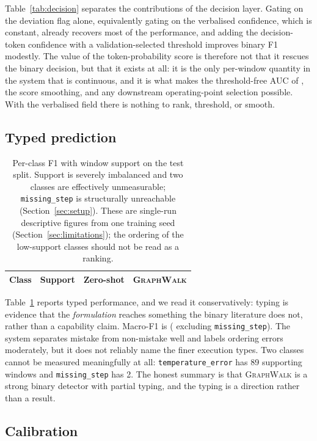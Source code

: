\documentclass[10pt,twocolumn]{article}
\newcommand{\ourmodel}{\textsc{GraphWalk}}
\begin{document}
Table~\ref{tab:decision} separates the contributions of the decision layer.
Gating on the deviation flag alone, equivalently gating on the verbalised
confidence, which is constant, already recovers most of the performance, and
adding the decision-token confidence with a validation-selected threshold
improves binary F1 modestly. The value of the token-probability score is
therefore not that it rescues the binary decision, but that it exists at all: it
is the only per-window quantity in the system that is continuous, and it is what
makes the threshold-free AUC of \resAUC{}, the score smoothing, and any
downstream operating-point selection possible. With the verbalised field there is
nothing to rank, threshold, or smooth.

\subsection{Typed prediction}

\begin{table}[t]
\centering\small
\begin{tabular}{lrcc}
\toprule
Class & Support & Zero-shot & \ourmodel{}\\
\midrule

\end{tabular}
\caption{Per-class F1 with window support on the test split. Support is severely
imbalanced and two classes are effectively unmeasurable;
\texttt{missing\_step} is structurally unreachable (Section~\ref{sec:setup}).
These are single-run descriptive figures from one training seed
(Section~\ref{sec:limitations}); the ordering of the low-support classes should
not be read as a ranking.}
\label{tab:perclass}
\end{table}

Table~\ref{tab:perclass} reports typed performance, and we read it
conservatively: typing is evidence that the \emph{formulation} reaches
something the binary literature does not, rather than a capability claim. Macro-F1 is \resMacro{} (\resMacroX{} excluding \texttt{missing\_step}).
The system separates mistake from non-mistake well and labels ordering errors
moderately, but it does not reliably name the finer execution types. Two classes cannot be measured meaningfully at all:
\texttt{temperature\_error} has 89 supporting windows and \texttt{missing\_step}
has 2. The honest summary is that \ourmodel{} is a strong binary detector with
partial typing, and the typing is a direction rather than a result.

\subsection{Calibration}
\end{document}
